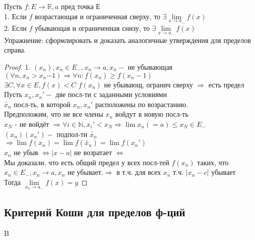 Пусть $ f : E \rightarrow \mathbb{R}, a $ пред точка Е\\
1. Если $ f $ возрастающая и ограниченная сверху, то $ \exists \lim\limits_{x \rightarrow a_- } f(x) $ \\
2. Если $ f $ убывающая и ограниченная снизу, то $ \exists \lim\limits_{x \rightarrow a_- } f(x) $ \\
Упражнение: сформлировать и доказать аналогичные утверждения для пределов справа.
\begin{proof}
	1. $ (x_n), x_n \in E_-, x_n \rightarrow a, x_n - $ не убывающая $ (\forall n, x_n > x_n{-1}) \Rightarrow \forall n : f(x_n) \geq f(x_n-1) $\\
	$ \exists C, \forall x \in E, f(x) < C$
	$ f(x_n) $ не убывающ, огранич сверху $ \Rightarrow$ есть предел\\
	Пусть $ x_n, x_n' - $ две посл-ти с заданными условиями \\
	$ \widetilde{x_n} $ посл-ть, в которой $ x_n, x_n' $ расположены по возрастанию.\\
	Предположим, что не все члены $ x_n $ войдут в новую посл-ть \\
	$ x_N $ - не войдёт $ \Rightarrow \forall i \in \mathbb{N}, x_i' < x_N \Rightarrow \lim x_n (=a) \leq x_N \in E_- $\\
	$ (x_n)(x_n') - $ подпол-ти $ \widetilde{x_n} $\\
	$ \Rightarrow \lim f(x_n) = \lim f(\widetilde{x_n}) = \lim f(x_n') $ \\
	$x_n $ не убыв $\Leftrightarrow |x-a| $ не возратает $ \Leftrightarrow$\\
	Мы доказали, что есть общий предел у всех посл-тей $ f(x_n) $ таких, что $ x_n \in E_-, x_n \rightarrow a, x_n $ не убывает.$ \Rightarrow $ в т.ч. для всех $ x_n $ т.ч. $ |x_n - c| $ убывает \\	
	Тогда $ \lim\limits_{x_n \rightarrow a_-} f(x) = y $
 \end{proof}

\subsection{Критерий Коши для пределов ф-ций}B

